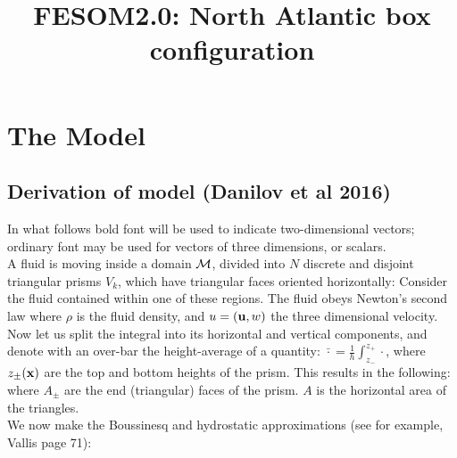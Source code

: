 \documentclass[10pt]{article}
\begin{document}
\title{FESOM2.0: North Atlantic box configuration}
\date{}
\maketitle

\section{The Model}

	\subsection{Derivation of model (Danilov et al 2016)}
In what follows bold font will be used to indicate two-dimensional vectors; ordinary font may be used for vectors of three dimensions, or scalars.\\
A fluid is moving inside a domain $\mathcal{M}$, divided into $N$ discrete and disjoint triangular prisms $V_{k}$, which have triangular faces oriented horizontally:
Consider the fluid contained within one of these regions. The fluid obeys Newton's second law
	where $\rho$ is the fluid density, and $u = (\mathbf{u},w)$ the three dimensional velocity. Now let us split the integral into its horizontal and vertical components, and denote with an over-bar the height-average of a quantity: $\bar{\cdot} = \frac{1}{h} \int_{z_{-}}^{z_{+}} \cdot$, where $z_{\pm}(\mathbf{x})$ are the top and bottom heights of the prism. This results in the following:
where $A_{\pm}$ are the end (triangular) faces of the prism. $A$ is the horizontal area of the triangles.  \\
\linebreak
We now make the Boussinesq and hydrostatic approximations (see for example, Vallis page 71):
\end{document}
